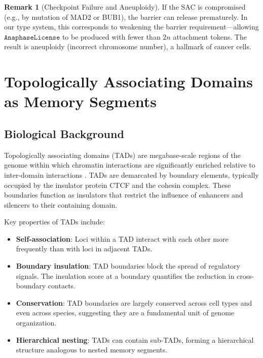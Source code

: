 \documentclass[12pt,a4paper]{article}
\theoremstyle{plain}
\theoremstyle{definition}
\newtheorem{remark}[theorem]{Remark}
\begin{document}
\begin{remark}[Checkpoint Failure and Aneuploidy]
If the SAC is compromised (e.g., by mutation of MAD2 or BUB1), the barrier can release prematurely. In our type system, this corresponds to weakening the barrier requirement---allowing $\texttt{AnaphaseLicense}$ to be produced with fewer than $2n$ attachment tokens. The result is aneuploidy (incorrect chromosome number), a hallmark of cancer cells.
\end{remark}


\section{Topologically Associating Domains as Memory Segments}\label{sec:tads}

\subsection{Biological Background}

Topologically associating domains (TADs) are megabase-scale regions of the genome within which chromatin interactions are significantly enriched relative to inter-domain interactions \cite{dixon2012topological, nora2012spatial}. TADs are demarcated by boundary elements, typically occupied by the insulator protein CTCF and the cohesin complex. These boundaries function as insulators that restrict the influence of enhancers and silencers to their containing domain.

Key properties of TADs include:
\begin{itemize}
  \item \textbf{Self-association}: Loci within a TAD interact with each other more frequently than with loci in adjacent TADs.
  \item \textbf{Boundary insulation}: TAD boundaries block the spread of regulatory signals. The insulation score at a boundary quantifies the reduction in cross-boundary contacts.
  \item \textbf{Conservation}: TAD boundaries are largely conserved across cell types and even across species, suggesting they are a fundamental unit of genome organization.
  \item \textbf{Hierarchical nesting}: TADs can contain sub-TADs, forming a hierarchical structure analogous to nested memory segments.
\end{itemize}
\end{document}
